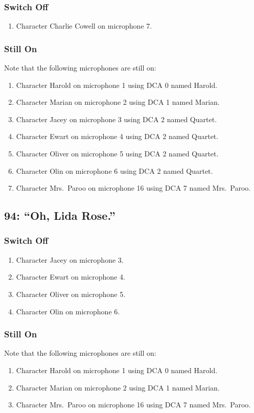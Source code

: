 \subsubsection* {Switch Off}
\begin{enumerate}
\item Character Charlie Cowell on microphone 7.
\end{enumerate}
\subsubsection* {Still On}
Note that the following microphones are still on:
\begin{enumerate}
\item Character Harold on microphone 1 using DCA 0 named Harold.
\item Character Marian on microphone 2 using DCA 1 named Marian.
\item Character Jacey on microphone 3 using DCA 2 named Quartet.
\item Character Ewart on microphone 4 using DCA 2 named Quartet.
\item Character Oliver on microphone 5 using DCA 2 named Quartet.
\item Character Olin on microphone 6 using DCA 2 named Quartet.
\item Character Mrs.~Paroo on microphone 16 using DCA 7 named Mrs.~Paroo.
\end{enumerate}
\subsection* {94: ``Oh, Lida Rose.''}
\subsubsection* {Switch Off}
\begin{enumerate}
\item Character Jacey on microphone 3.
\item Character Ewart on microphone 4.
\item Character Oliver on microphone 5.
\item Character Olin on microphone 6.
\end{enumerate}
\subsubsection* {Still On}
Note that the following microphones are still on:
\begin{enumerate}
\item Character Harold on microphone 1 using DCA 0 named Harold.
\item Character Marian on microphone 2 using DCA 1 named Marian.
\item Character Mrs.~Paroo on microphone 16 using DCA 7 named Mrs.~Paroo.
\end{enumerate}
